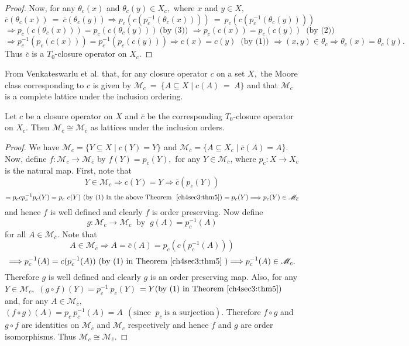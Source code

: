 \documentclass[
11pt,%
tightenlines,%
twoside,%
onecolumn,%
nofloats,%
nobibnotes,%
nofootinbib,%
superscriptaddress,%
noshowpacs,%
centertags]%
{revtex4}
\begin{document}
\begin{proof}
Now, for any $\theta_c (x)$ and $\theta_c (y) \in X_c,$  where $x$ and $y \in X,$
$$
 \overline{c}( \theta_c (x)) ~=~\overline{c}( \theta_c (y))
 \Longrightarrow p_c(c(p_{c} ^{-1}(\theta_c (x)))) ~=~ p_c(c(p_{c} ^{-1}(\theta_c (y))))
$$
$$
 \Longrightarrow p_c(c(\theta_c (x)))  = p_c(c(\theta_c (y))) ~\text{(by (3)) }
 \Longrightarrow p_c (c(x)) = p_c(c(y)) ~\text{ (by (2)) }
$$
$$
\Longrightarrow p_{c} ^{-1} ( p_c ( c (x))) = p_{c} ^{-1} ( p_c ( c (y)))
\Longrightarrow c(x) = c(y)  ~\text{ (by (1)) }  \Longrightarrow (x,y) \in \theta_c
 \Longrightarrow \theta_c (x) = \theta_c (y).
$$
Thus $\overline{c}$ is a $T_0$-closure operator on $X_c$.
\end{proof}

From  Venkateswarlu et al. \cite{7} that, for any closure operator
$c$ on a set $X,$ the Moore class corresponding to $c$ is given by $
\mathscr{M}_c ~=~ \{ A \subseteq X \mid c(A)~=~A \}$ and that $
\mathscr{M}_c $ is a complete lattice under the inclusion ordering.

\begin{theorem}
\label{ch4sec3:thm6} Let $c$ be a closure operator on $X$ and
$\overline{c}$ be the corresponding  $T_0$-closure operator on $X_c
.$ Then $\mathscr{M}_c \cong \mathscr{M}_{\overline{c}}$ as lattices
under the inclusion orders.
\end{theorem}

 \begin{proof}
We have $\mathscr{M}_c  = \{ Y \subseteq X \mid c(Y) = Y \}$ and $\mathscr{M}_{\overline{c}}
 = \{ A \subseteq X_c \mid \overline{c}(A) = A \}.$
Now, define $f: \mathscr{M}_c \longrightarrow
\mathscr{M}_{\overline{c}}$ by $f(Y) = p_c (Y),$ for any $Y \in
\mathscr{M}_c$, where $p_c : X \longrightarrow X_c$ is the natural
map.  First, note that
$$
Y \in \mathscr{M}_c  \Longrightarrow c(Y) = Y\Longrightarrow \overline{c}(p_c (Y))
$$
$$
= p_c c p_{c} ^{-1} p_c (Y) = p_c  ~c(Y) ~( \text{by (1)
in the above Theorem ~\ref{ch4sec3:thm5}} )= p_c (Y)
\Longrightarrow p_c (Y) \in \mathscr{M}_{\overline{c}}
$$
and hence $f$ is well defined and clearly $f$ is order preserving. Now define
$$
 g : \mathscr{M}_{\overline{c}}  \longrightarrow \mathscr{M}_c ~ \text{ by } ~
 g(A)= p_{c} ^{-1} (A)
 $$
 for all $A \in \mathscr{M}_{\overline{c}}. $
 Note that
$$
A \in \mathscr{M}_{ \overline{c} } \Longrightarrow A = \overline{c} (A) = p_c (c ( p_{c} ^{-1} (A)))
$$
$$
\Longrightarrow p_{c} ^{-1} (A) = c( p_{c} ^{-1} (A)) ~(\text{by (1) in Theorem \ref{ch4sec3:thm5} } )
 \Longrightarrow p_{c} ^{-1} (A) \in \mathscr{M}_c.
$$
Therefore $g$ is well defined and clearly $g$ is an order preserving
map. Also, for any $Y \in \mathscr{M}_c,$ $(g\circ f )(Y) = p_{c}
^{-1} ~p_c (Y)$ $= Y ( \text{by (1) in Theorem \ref{ch4sec3:thm5}})$
and, for any $A \in \mathscr{M}_{\overline{c}},$ $(f \circ g) (A) =
p_c ~ p_{c} ^{-1} (A) = A ~~(\text{since }~p_c ~ \text{is a
surjection}).$ Therefore $f \circ g$ and $g \circ f$ are identities
on $\mathscr{M}_{\overline{c}}$ and  $\mathscr{M}_c$ respectively
and hence $f$ and $g$ are order isomorphisms. Thus $\mathscr{M}_c
\cong \mathscr{M}_{\overline{c}} $.
\end{proof}
\end{document}
